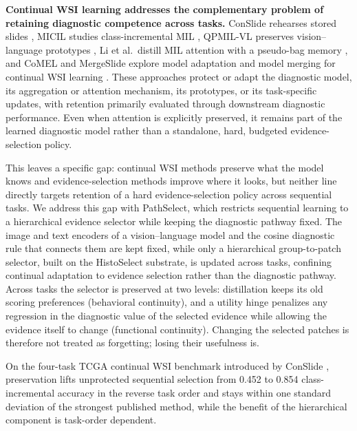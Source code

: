 \documentclass{article}
\begin{document}
\textbf{Continual WSI learning addresses the complementary problem of retaining diagnostic competence across tasks.} ConSlide rehearses stored slides \cite{huang2023conslide}, MICIL studies class-incremental MIL \cite{meseguer2024micil}, QPMIL-VL preserves vision--language prototypes \cite{gou2025qpmil}, Li et al.\ distill MIL attention with a pseudo-bag memory \cite{li2025akd}, and CoMEL and MergeSlide explore model adaptation and model merging for continual WSI learning \cite{lee2025comel,bui2026mergeslide}. These approaches protect or adapt the diagnostic model, its aggregation or attention mechanism, its prototypes, or its task-specific updates, with retention primarily evaluated through downstream diagnostic performance. Even when attention is explicitly preserved, it remains part of the learned diagnostic model rather than a standalone, hard, budgeted evidence-selection policy.

This leaves a specific gap: continual WSI methods preserve what the model knows and evidence-selection methods improve where it looks, but neither line directly targets retention of a hard evidence-selection policy across sequential tasks. We address this gap with PathSelect, which restricts sequential learning to a hierarchical evidence selector while keeping the diagnostic pathway fixed. The image and text encoders of a vision--language model and the cosine diagnostic rule that connects them are kept fixed, while only a hierarchical group-to-patch selector, built on the HistoSelect substrate, is updated across tasks, confining continual adaptation to evidence selection rather than the diagnostic pathway. Across tasks the selector is preserved at two levels: distillation keeps its old scoring preferences (behavioral continuity), and a utility hinge penalizes any regression in the diagnostic value of the selected evidence while allowing the evidence itself to change (functional continuity). Changing the selected patches is therefore not treated as forgetting; losing their usefulness is.

On the four-task TCGA continual WSI benchmark introduced by ConSlide \cite{huang2023conslide}, preservation lifts unprotected sequential selection from 0.452 to 0.854 class-incremental accuracy in the reverse task order and stays within one standard deviation of the strongest published method, while the benefit of the hierarchical component is task-order dependent.
\end{document}
